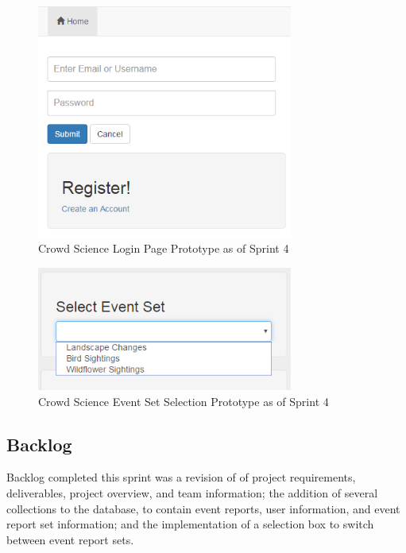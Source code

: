 \begin{figure}[tbh]
\begin{center}
\includegraphics[width=0.75\textwidth]{./figures/prototype_S4_login.png}
\end{center}
\caption{Crowd Science Login Page Prototype as of Sprint 4\label{prototype_S4_login}}
\end{figure}

\begin{figure}[tbh]
\begin{center}
\includegraphics[width=0.75\textwidth]{./figures/prototype_S4_selectbox.png}
\end{center}
\caption{Crowd Science Event Set Selection Prototype as of Sprint 4\label{prototype_S4_selectbox}}
\end{figure}

\subsection{Backlog}
Backlog completed this sprint was a revision of of project requirements, deliverables, project overview, and team information; the addition of several collections to the database, to contain event reports, user information, and event report set information; and the implementation of a selection box to switch between event report sets.
